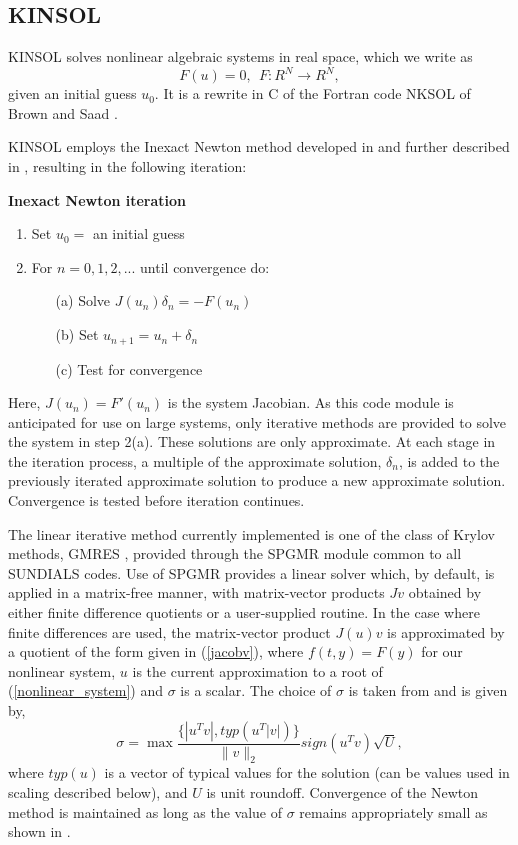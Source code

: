\subsection{KINSOL}

KINSOL solves nonlinear algebraic systems in real space, which we write as
\begin{equation}
F(u) = 0,~~ F:R^N \rightarrow R^N, 
\label{nonlinear_system}
\end{equation}
given an initial guess $u_0$.  It is a rewrite in C of the Fortran
code NKSOL of Brown and Saad \cite{BrSa:90}.

KINSOL employs the Inexact Newton method developed in 
\cite{BrSa:90,Bro:87,DES:82} 
and further described in \cite{DeSc:96,Kel:95}, 
resulting in the following iteration:

\vspace{0.2in}
{\bf Inexact Newton iteration}
\begin{enumerate}
   \item Set $u_0 = $ an initial guess
   \item For $n = 0, 1, 2,...$ until convergence do:\nonumber 
      \begin{itemize}
          \item[(a)] Solve $J(u_n)\delta_n = - F(u_n)$ 
     	  \item[(b)] Set $u_{n+1} = u_n + \delta_n$
          \item[(c)] Test for convergence
      \end{itemize}
\end{enumerate}
Here, $J(u_n) = F'(u_n)$ is the system Jacobian. As this code module is
anticipated for use on large systems, only iterative methods are provided 
to solve the system in step 2(a). These solutions are only approximate. 
At each stage in the iteration process, a multiple of the 
approximate solution, $\delta_n$, is added 
to the previously iterated approximate solution to produce a new 
approximate solution. Convergence is tested before iteration continues. 

The linear iterative method currently implemented is one of the class of 
Krylov methods, GMRES \cite{BrHi:89,SaSc:86}, 
provided through the SPGMR module common to all SUNDIALS codes. 
Use of SPGMR provides a linear solver which, by default, is applied in a 
matrix-free manner, with matrix-vector products $Jv$ obtained by either 
finite difference quotients or a user-supplied routine.
In the case where finite differences are used, 
the matrix-vector product $J(u)v$ is approximated by a quotient of the form
given in (\ref{jacobv}),
where $f(t, y) = F(y)$ for our nonlinear system, 
$u$ is the current approximation to a root of (\ref{nonlinear_system}) 
and $\sigma$ is a scalar.  The choice of $\sigma$ is taken from 
\cite{BrSa:90} and is given by,
\begin{equation}
\sigma = \max\frac{\{|u^T v|, typ(u^T |v|)\}}{\|v\|_2} sign(u^T v) 
\sqrt{U},
\label{sigma_comp}
\end{equation}
where $typ(u)$ is a vector of typical values for the solution (can be 
values used in scaling described below), and $U$ is unit roundoff.
Convergence of the Newton method is maintained as long as the value
of $\sigma$ remains appropriately small as shown in \cite{Bro:87}.

